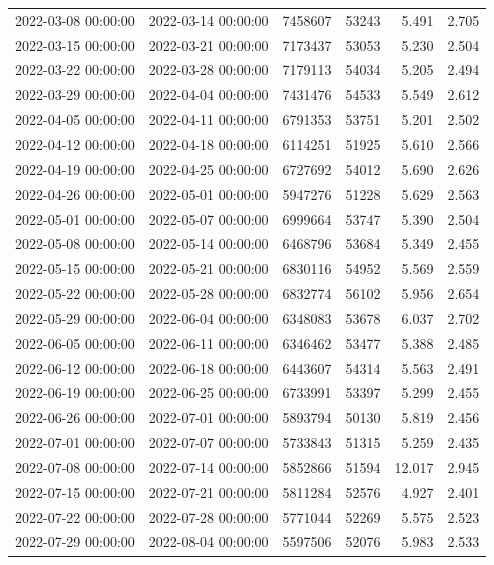 \begin{tabular}{llrrrr}
2022-03-08 00:00:00 & 2022-03-14 00:00:00 & 7458607 & 53243 & 5.491 & 2.705 \\
2022-03-15 00:00:00 & 2022-03-21 00:00:00 & 7173437 & 53053 & 5.230 & 2.504 \\
2022-03-22 00:00:00 & 2022-03-28 00:00:00 & 7179113 & 54034 & 5.205 & 2.494 \\
2022-03-29 00:00:00 & 2022-04-04 00:00:00 & 7431476 & 54533 & 5.549 & 2.612 \\
2022-04-05 00:00:00 & 2022-04-11 00:00:00 & 6791353 & 53751 & 5.201 & 2.502 \\
2022-04-12 00:00:00 & 2022-04-18 00:00:00 & 6114251 & 51925 & 5.610 & 2.566 \\
2022-04-19 00:00:00 & 2022-04-25 00:00:00 & 6727692 & 54012 & 5.690 & 2.626 \\
2022-04-26 00:00:00 & 2022-05-01 00:00:00 & 5947276 & 51228 & 5.629 & 2.563 \\
2022-05-01 00:00:00 & 2022-05-07 00:00:00 & 6999664 & 53747 & 5.390 & 2.504 \\
2022-05-08 00:00:00 & 2022-05-14 00:00:00 & 6468796 & 53684 & 5.349 & 2.455 \\
2022-05-15 00:00:00 & 2022-05-21 00:00:00 & 6830116 & 54952 & 5.569 & 2.559 \\
2022-05-22 00:00:00 & 2022-05-28 00:00:00 & 6832774 & 56102 & 5.956 & 2.654 \\
2022-05-29 00:00:00 & 2022-06-04 00:00:00 & 6348083 & 53678 & 6.037 & 2.702 \\
2022-06-05 00:00:00 & 2022-06-11 00:00:00 & 6346462 & 53477 & 5.388 & 2.485 \\
2022-06-12 00:00:00 & 2022-06-18 00:00:00 & 6443607 & 54314 & 5.563 & 2.491 \\
2022-06-19 00:00:00 & 2022-06-25 00:00:00 & 6733991 & 53397 & 5.299 & 2.455 \\
2022-06-26 00:00:00 & 2022-07-01 00:00:00 & 5893794 & 50130 & 5.819 & 2.456 \\
2022-07-01 00:00:00 & 2022-07-07 00:00:00 & 5733843 & 51315 & 5.259 & 2.435 \\
2022-07-08 00:00:00 & 2022-07-14 00:00:00 & 5852866 & 51594 & 12.017 & 2.945 \\
2022-07-15 00:00:00 & 2022-07-21 00:00:00 & 5811284 & 52576 & 4.927 & 2.401 \\
2022-07-22 00:00:00 & 2022-07-28 00:00:00 & 5771044 & 52269 & 5.575 & 2.523 \\
2022-07-29 00:00:00 & 2022-08-04 00:00:00 & 5597506 & 52076 & 5.983 & 2.533 \\

\end{tabular}
